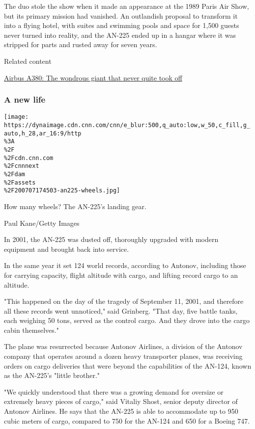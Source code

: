 The duo stole the show when it made an appearance at the 1989 Paris Air
Show, but its primary mission had vanished. An outlandish proposal to
transform it into a flying hotel, with suites and swimming pools and
space for 1,500 guests never turned into reality, and the AN-225 ended
up in a hangar where it was stripped for parts and rusted away for seven
years.

Related content

\href{/travel/article/airbus-a380-birth-and-death/index.html}{Airbus
A380: The wondrous giant that never quite took off}

\hypertarget{a-new-life}{%
\subsubsection{A new life}\label{a-new-life}}

\texttt{[image: https://dynaimage.cdn.cnn.com/cnn/e\_blur:500,q\_auto:low,w\_50,c\_fill,g\_auto,h\_28,ar\_16:9/http\\\%3A\\\%2F\\\%2Fcdn.cnn.com\\\%2Fcnnnext\\\%2Fdam\\\%2Fassets\\\%2F200707174503-an225-wheels.jpg]}

How many wheels? The AN-225's landing gear.

Paul Kane/Getty Images

In 2001, the AN-225 was dusted off, thoroughly upgraded with modern
equipment and brought back into service.

In the same year it set 124 world records, according to Antonov,
including those for carrying capacity, flight altitude with cargo, and
lifting record cargo to an altitude.

"This happened on the day of the tragedy of September 11, 2001, and
therefore all these records went unnoticed," said Grinberg. "That day,
five battle tanks, each weighing 50 tons, served as the control cargo.
And they drove into the cargo cabin themselves."

The plane was resurrected because Antonov Airlines, a division of the
Antonov company that operates around a dozen heavy transporter planes,
was receiving orders on cargo deliveries that were beyond the
capabilities of the AN-124, known as the AN-225's "little brother."

"We quickly understood that there was a growing demand for oversize or
extremely heavy pieces of cargo," said Vitaliy Shost, senior deputy
director of Antonov Airlines. He says that the AN-225 is able to
accommodate up to 950 cubic meters of cargo, compared to 750 for the
AN-124 and 650 for a Boeing 747.


